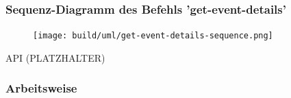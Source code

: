 \documentclass[aspectratio=1610]{beamer}
\begin{document}
	\begin{frame}[plain]
        \frametitle{Sequenz-Diagramm des Befehls 'get-event-details'}
        \begin{figure}[!htb]
            \centering
            \texttt{[image: build/uml/get-event-details-sequence.png]}
        \end{figure}
    \end{frame}


	\begin{frame}[plain]
        API (PLATZHALTER)
	\end{frame}



    \begin{frame}[plain]
        \frametitle{Arbeitsweise}
        \begin{minipage}{0.5\textwidth}
\end{minipage}
\end{frame}
\end{document}
